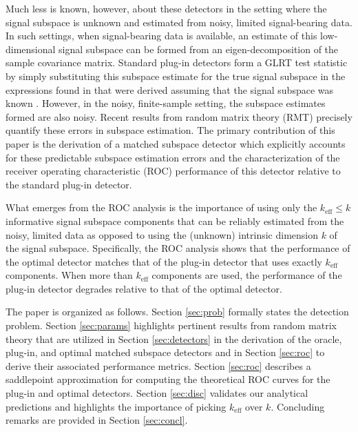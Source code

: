 Much less is known, however, about these detectors in the setting where the signal subspace is unknown and estimated from noisy, limited signal-bearing data. In such settings, when signal-bearing data is available, an estimate of this low-dimensional signal subspace can be formed from an eigen-decomposition of the sample covariance matrix. Standard plug-in detectors form a GLRT test statistic by simply substituting this subspace estimate for the true signal subspace in the expressions found in \cite{mcwhorter2003matched,jin2005cfar} that were derived assuming that the signal subspace was known . However, in the noisy, finite-sample setting, the subspace estimates formed are also noisy. Recent results from random matrix theory (RMT)  precisely quantify these errors in subspace estimation. The primary contribution of this paper is the derivation of a matched subspace detector which explicitly accounts for these predictable subspace estimation errors and the characterization of the receiver operating characteristic (ROC) performance of this detector  relative to the standard plug-in detector.

What emerges from the ROC analysis is the importance of using only the $k_\text{eff} \leq k$ informative signal subspace components that can be reliably estimated from the noisy, limited data as opposed to using the (unknown) intrinsic dimension $k$ of the signal subspace.  Specifically, the ROC analysis shows that the performance of the optimal detector matches that of the plug-in detector that uses exactly $k_\text{eff}$ components. When more than $k_{\text{eff}}$ components are used, the performance of the plug-in detector degrades relative to that of the optimal detector.

The paper is organized as follows. Section \ref{sec:prob} formally states the detection problem. Section \ref{sec:params} highlights pertinent results from random matrix theory that are utilized in Section \ref{sec:detectors} in the derivation of the oracle, plug-in, and optimal matched subspace detectors and in Section \ref{sec:roc} to derive their associated performance metrics. Section \ref{sec:roc} describes a saddlepoint approximation for computing the theoretical ROC curves for the plug-in and optimal detectors. Section \ref{sec:disc} validates our analytical predictions and highlights the importance of picking $k_{\text{eff}}$ over $k$. Concluding remarks are provided in Section \ref{sec:concl}.


